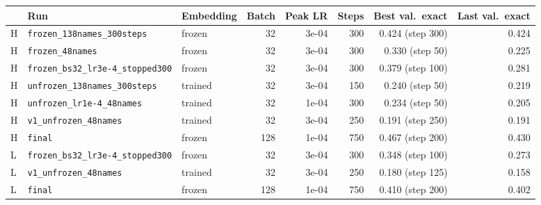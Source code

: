 \begin{tabular}{lllrrrrr}
\toprule
& Run & Embedding & Batch & Peak LR & Steps & Best val.\ exact & Last val.\ exact \\
\midrule
H & \texttt{frozen\_138names\_300steps} & frozen & 32 & 3e-04 & 300 & 0.424 (step 300) & 0.424 \\
H & \texttt{frozen\_48names} & frozen & 32 & 3e-04 & 300 & 0.330 (step 50) & 0.225 \\
H & \texttt{frozen\_bs32\_lr3e-4\_stopped300} & frozen & 32 & 3e-04 & 300 & 0.379 (step 100) & 0.281 \\
H & \texttt{unfrozen\_138names\_300steps} & trained & 32 & 3e-04 & 150 & 0.240 (step 50) & 0.219 \\
H & \texttt{unfrozen\_lr1e-4\_48names} & trained & 32 & 1e-04 & 300 & 0.234 (step 50) & 0.205 \\
H & \texttt{v1\_unfrozen\_48names} & trained & 32 & 3e-04 & 250 & 0.191 (step 250) & 0.191 \\
H & \texttt{final} & frozen & 128 & 1e-04 & 750 & 0.467 (step 200) & 0.430 \\
L & \texttt{frozen\_bs32\_lr3e-4\_stopped300} & frozen & 32 & 3e-04 & 300 & 0.348 (step 100) & 0.273 \\
L & \texttt{v1\_unfrozen\_48names} & trained & 32 & 3e-04 & 250 & 0.180 (step 125) & 0.158 \\
L & \texttt{final} & frozen & 128 & 1e-04 & 750 & 0.410 (step 200) & 0.402 \\
\bottomrule
\end{tabular}
